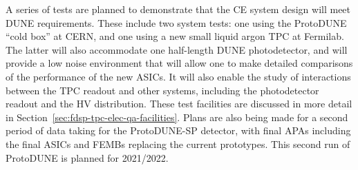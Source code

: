 A series of tests are planned to demonstrate that the CE system design will meet DUNE requirements. These include two system tests: one using the ProtoDUNE ``cold box'' at CERN, and one using a new small liquid argon TPC at Fermilab. The latter will also accommodate one half-length DUNE photodetector, and will provide a low noise environment that will allow one to make detailed comparisons of the performance of the new ASICs. It will also enable the study of interactions between the TPC readout and other systems, including the photodetector readout and the HV distribution. These test facilities are discussed in more detail in Section~\ref{sec:fdsp-tpc-elec-qa-facilities}. Plans are also being made for a second period of data taking for the ProtoDUNE-SP detector, with final APAs including the final ASICs and FEMBs replacing the current prototypes. This second run of ProtoDUNE is planned for 2021/2022.
